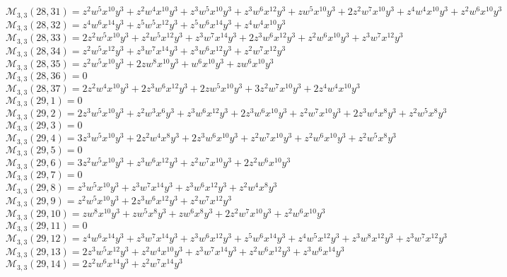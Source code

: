 $\mathcal{M}_{3,3}(28,31)=z^2w^5x^{10}y^3+z^2w^4x^{10}y^3+z^3w^5x^{10}y^3+z^3w^6x^{12}y^3+zw^5x^{10}y^3+2z^2w^7x^{10}y^3+z^4w^4x^{10}y^3+z^2w^6x^{10}y^3$\\
$\mathcal{M}_{3,3}(28,32)=z^4w^6x^{14}y^3+z^5w^5x^{12}y^3+z^5w^6x^{14}y^3+z^4w^4x^{10}y^3$\\
$\mathcal{M}_{3,3}(28,33)=2z^2w^5x^{10}y^3+z^2w^5x^{12}y^3+z^3w^7x^{14}y^3+2z^3w^6x^{12}y^3+z^2w^6x^{10}y^3+z^3w^7x^{12}y^3$\\
$\mathcal{M}_{3,3}(28,34)=z^2w^5x^{12}y^3+z^3w^7x^{14}y^3+z^3w^6x^{12}y^3+z^2w^7x^{12}y^3$\\
$\mathcal{M}_{3,3}(28,35)=z^2w^5x^{10}y^3+2zw^8x^{10}y^3+w^6x^{10}y^3+zw^6x^{10}y^3$\\
$\mathcal{M}_{3,3}(28,36)=0$\\
$\mathcal{M}_{3,3}(28,37)=2z^2w^4x^{10}y^3+2z^3w^6x^{12}y^3+2zw^5x^{10}y^3+3z^2w^7x^{10}y^3+2z^4w^4x^{10}y^3$\\
$\mathcal{M}_{3,3}(29,1)=0$\\
$\mathcal{M}_{3,3}(29,2)=2z^3w^5x^{10}y^3+z^2w^3x^6y^3+z^3w^6x^{12}y^3+2z^3w^6x^{10}y^3+z^2w^7x^{10}y^3+2z^3w^4x^8y^3+z^2w^5x^8y^3$\\
$\mathcal{M}_{3,3}(29,3)=0$\\
$\mathcal{M}_{3,3}(29,4)=3z^3w^5x^{10}y^3+2z^2w^4x^8y^3+2z^3w^6x^{10}y^3+z^2w^7x^{10}y^3+z^2w^6x^{10}y^3+z^2w^5x^8y^3$\\
$\mathcal{M}_{3,3}(29,5)=0$\\
$\mathcal{M}_{3,3}(29,6)=3z^2w^5x^{10}y^3+z^3w^6x^{12}y^3+z^2w^7x^{10}y^3+2z^2w^6x^{10}y^3$\\
$\mathcal{M}_{3,3}(29,7)=0$\\
$\mathcal{M}_{3,3}(29,8)=z^3w^5x^{10}y^3+z^3w^7x^{14}y^3+z^3w^6x^{12}y^3+z^2w^4x^8y^3$\\
$\mathcal{M}_{3,3}(29,9)=z^2w^5x^{10}y^3+2z^3w^6x^{12}y^3+z^2w^7x^{12}y^3$\\
$\mathcal{M}_{3,3}(29,10)=zw^8x^{10}y^3+zw^5x^8y^3+zw^6x^8y^3+2z^2w^7x^{10}y^3+z^2w^6x^{10}y^3$\\
$\mathcal{M}_{3,3}(29,11)=0$\\
$\mathcal{M}_{3,3}(29,12)=z^4w^6x^{14}y^3+z^3w^7x^{14}y^3+z^3w^6x^{12}y^3+z^5w^6x^{14}y^3+z^4w^5x^{12}y^3+z^3w^8x^{12}y^3+z^3w^7x^{12}y^3$\\
$\mathcal{M}_{3,3}(29,13)=2z^3w^5x^{12}y^3+z^2w^4x^{10}y^3+z^3w^7x^{14}y^3+z^2w^6x^{12}y^3+z^3w^6x^{14}y^3$\\
$\mathcal{M}_{3,3}(29,14)=2z^2w^6x^{14}y^3+z^2w^7x^{14}y^3$\\

